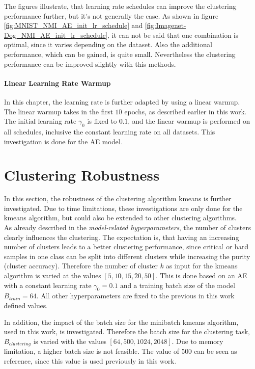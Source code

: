 \documentclass[12pt,DIV14,BCOR12mm,a4paper,footexclude,headinclude,halfparskip-,twoside,openright,cleardoubleempty,idxtotoc,bibtotoc,listtotoc]{scrreprt} %
\numberwithin{equation}{chapter}
\begin{document}
The figures illustrate, that learning rate schedules can improve the clustering performance further, but it's not generally the case. As shown in figure \ref{fig:MNIST_NMI_AE_init_lr_schedule} and \ref{fig:Imagenet-Dog_NMI_AE_init_lr_schedule}, it can not be said that one combination is optimal, since it varies depending on the dataset. Also the additional performance, which can be gained, is quite small. Nevertheless the clustering performance can be improved slightly with this methods.
\paragraph{Linear Learning Rate Warmup}
In this chapter, the learning rate is further adapted by using a linear warmup. The linear warmup takes in the first $10$ epochs, as described earlier in this work. The initial learning rate $\gamma_0$ is fixed to $0.1$, and the linear warmup is performed on all schedules, inclusive the constant learning rate on all datasets. This investigation is done for the AE model.
\section{Clustering Robustness}
In this section, the robustness of the clustering algorithm kmeans is further investigated. Due to time limitations, these investigations are only done for the kmeans algorithm, but could also be extended to other clustering algorithms.\\
As already described in the \textit{model-related hyperparameters}, the number of clusters clearly influences the clustering. The expectation is, that having an increasing number of clusters leads to a better clustering performance, since critical or hard samples in one class can be split into different clusters while increasing the purity (cluster accuracy). Therefore the number of cluster $k$ as input for the kmeans algorithm is varied at the values $[5, 10, 15, 20, 50]$. This is done based on an AE with a constant learning rate $\gamma_0=0.1$ and a training batch size of the model $B_{train}=64$. All other hyperparameters are fixed to the previous in this work defined values.

In addition, the impact of the batch size for the minibatch kmeans algorithm, used in this work, is investigated. Therefore the batch size for the clustering task, $B_{clustering}$ is varied with the values $[64, 500, 1024, 2048]$. Due to memory limitation, a higher batch size is not feasible. The value of $500$ can be seen as reference, since this value is used previously in this work.
\end{document}
